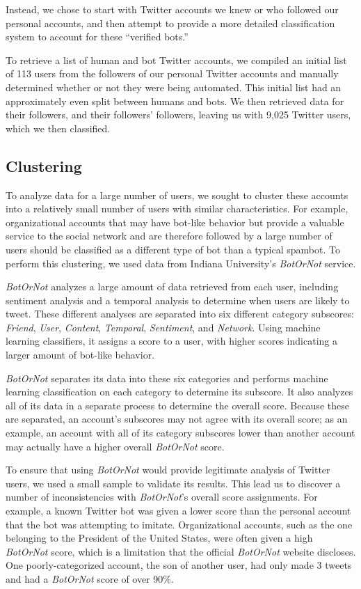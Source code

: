\documentclass{sig-alternate-05-2015}
\begin{document}
Instead, we chose to start with Twitter accounts we knew or who followed our personal accounts, and then attempt to provide a more detailed classification system to account for these ``verified bots.''

To retrieve a list of human and bot Twitter accounts, we compiled an initial list of 113 users from the followers of our personal Twitter accounts and manually determined whether or not they were being automated. This initial list had an approximately even split between humans and bots. We then retrieved data for their followers, and their followers' followers, leaving us with 9,025 Twitter users, which we then classified.

\subsection{Clustering}

To analyze data for a large number of users, we sought to cluster these accounts into a relatively small number of users with similar characteristics. For example, organizational accounts that may have bot-like behavior but provide a valuable service to the social network and are therefore followed by a large number of users should be classified as a different type of bot than a typical spambot. To perform this clustering, we used data from Indiana University's \emph{BotOrNot} service.

\emph{BotOrNot} analyzes a large amount of data retrieved from each user, including sentiment analysis and a temporal analysis to determine when users are likely to tweet. These different analyses are separated into six different category subscores: \emph{Friend}, \emph{User}, \emph{Content}, \emph{Temporal}, \emph{Sentiment}, and \emph{Network}\cite{Davis:BotOrNot}. Using machine learning classifiers, it assigns a score to a user, with higher scores indicating a larger amount of bot-like behavior.

\emph{BotOrNot} separates its data into these six categories and performs machine learning classification on each category to determine its subscore. It also analyzes all of its data in a separate process to determine the overall score. Because these are separated, an account's subscores may not agree with its overall score; as an example, an account with all of its category subscores lower than another account may actually have a higher overall \emph{BotOrNot} score.

To ensure that using \emph{BotOrNot} would provide legitimate analysis of Twitter users, we used a small sample to validate its results. This lead us to discover a number of inconsistencies with \emph{BotOrNot}'s overall score assignments. For example, a known Twitter bot was given a lower score than the personal account that the bot was attempting to imitate. Organizational accounts, such as the one belonging to the President of the United States, were often given a high \emph{BotOrNot} score, which is a limitation that the official \emph{BotOrNot} website discloses. One poorly-categorized account, the son of another user, had only made 3 tweets and had a \emph{BotOrNot} score of over 90\%.
\end{document}
